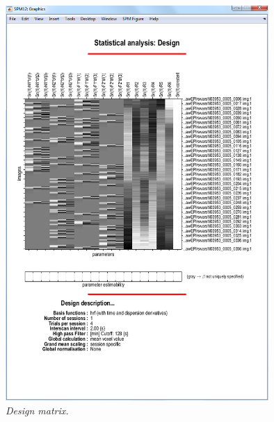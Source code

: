 \documentclass[a4paper,titlepage]{book}
\begin{document}
\begin{figure}
\begin{center}
\includegraphics[width=100mm]{cat_design}
\caption{\em Design matrix. \label{cat_design}}
\end{center}
\end{figure}
\end{document}
